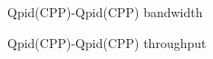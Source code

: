 \documentclass{thesis}
\begin{document}
\begin{figure}[tb] 
\centering
\caption{Qpid(CPP)-Qpid(CPP) bandwidth}
\label{qpid-qpid-bandwidth}
\end{figure}

\begin{figure}[tb] 
\centering
\caption{Qpid(CPP)-Qpid(CPP) throughput}
\label{qpid-qpid-throughput}
\end{figure}
\end{document}
